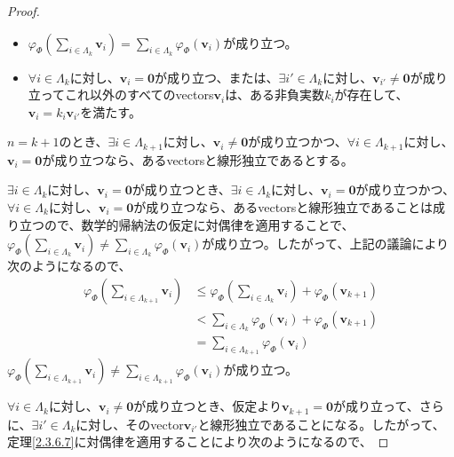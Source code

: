 \documentclass[dvipdfmx]{jsarticle}
\begin{document}
\begin{proof}
\begin{itemize}
\item
  $\varphi_{\varPhi}\left( \sum_{i \in \varLambda_{k}} \mathbf{v}_{i} \right) = \sum_{i \in \varLambda_{k}} {\varphi_{\varPhi}\left( \mathbf{v}_{i} \right)}$が成り立つ。
\item
  $\forall i \in \varLambda_{k}$に対し、$\mathbf{v}_{i} = \mathbf{0}$が成り立つ、または、$\exists i' \in \varLambda_{k}$に対し、$\mathbf{v}_{i'} \neq \mathbf{0}$が成り立ってこれ以外のすべてのvectors$\mathbf{v}_{i}$は、ある非負実数$k_{i}$が存在して、$\mathbf{v}_{i} = k_{i}\mathbf{v}_{i'}$を満たす。
\end{itemize}
$n = k + 1$のとき、$\exists i \in \varLambda_{k + 1}$に対し、$\mathbf{v}_{i} \neq \mathbf{0}$が成り立つかつ、$\forall i \in \varLambda_{k + 1}$に対し、$\mathbf{v}_{i} = \mathbf{0}$が成り立つなら、あるvectorsと線形独立であるとする。\par
$\exists i \in \varLambda_{k}$に対し、$\mathbf{v}_{i} = \mathbf{0}$が成り立つとき、$\exists i \in \varLambda_{k}$に対し、$\mathbf{v}_{i} = \mathbf{0}$が成り立つかつ、$\forall i \in \varLambda_{k}$に対し、$\mathbf{v}_{i} = \mathbf{0}$が成り立つなら、あるvectorsと線形独立であることは成り立つので、数学的帰納法の仮定に対偶律を適用することで、$\varphi_{\varPhi}\left( \sum_{i \in \varLambda_{k}} \mathbf{v}_{i} \right) \neq \sum_{i \in \varLambda_{k}} {\varphi_{\varPhi}\left( \mathbf{v}_{i} \right)}$が成り立つ。したがって、上記の議論により次のようになるので、
\begin{align*}
\varphi_{\varPhi}\left( \sum_{i \in \varLambda_{k + 1}} \mathbf{v}_{i} \right) &\leq \varphi_{\varPhi}\left( \sum_{i \in \varLambda_{k}} \mathbf{v}_{i} \right) + \varphi_{\varPhi}\left( \mathbf{v}_{k + 1} \right)\\
&< \sum_{i \in \varLambda_{k}} {\varphi_{\varPhi}\left( \mathbf{v}_{i} \right)} + \varphi_{\varPhi}\left( \mathbf{v}_{k + 1} \right)\\
&= \sum_{i \in \varLambda_{k + 1}} {\varphi_{\varPhi}\left( \mathbf{v}_{i} \right)}
\end{align*}
$\varphi_{\varPhi}\left( \sum_{i \in \varLambda_{k + 1}} \mathbf{v}_{i} \right) \neq \sum_{i \in \varLambda_{k + 1}} {\varphi_{\varPhi}\left( \mathbf{v}_{i} \right)}$が成り立つ。\par
$\forall i \in \varLambda_{k}$に対し、$\mathbf{v}_{i} \neq \mathbf{0}$が成り立つとき、仮定より$\mathbf{v}_{k + 1} = \mathbf{0}$が成り立って、さらに、$\exists i' \in \varLambda_{k}$に対し、そのvector$\mathbf{v}_{i'}$と線形独立であることになる。したがって、定理\ref{2.3.6.7}に対偶律を適用することにより次のようになるので、

\end{proof}
\end{document}
